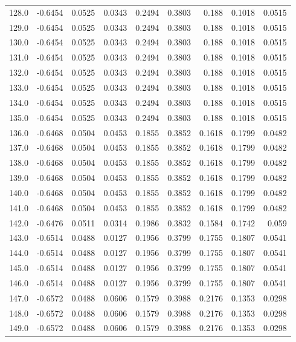 \begin{longtable}{lrrrrrrrr}
128.0 & -0.6454 & 0.0525 & 0.0343 & 0.2494 & 0.3803 & 0.188 & 0.1018 & 0.0515 \\
129.0 & -0.6454 & 0.0525 & 0.0343 & 0.2494 & 0.3803 & 0.188 & 0.1018 & 0.0515 \\
130.0 & -0.6454 & 0.0525 & 0.0343 & 0.2494 & 0.3803 & 0.188 & 0.1018 & 0.0515 \\
131.0 & -0.6454 & 0.0525 & 0.0343 & 0.2494 & 0.3803 & 0.188 & 0.1018 & 0.0515 \\
132.0 & -0.6454 & 0.0525 & 0.0343 & 0.2494 & 0.3803 & 0.188 & 0.1018 & 0.0515 \\
133.0 & -0.6454 & 0.0525 & 0.0343 & 0.2494 & 0.3803 & 0.188 & 0.1018 & 0.0515 \\
134.0 & -0.6454 & 0.0525 & 0.0343 & 0.2494 & 0.3803 & 0.188 & 0.1018 & 0.0515 \\
135.0 & -0.6454 & 0.0525 & 0.0343 & 0.2494 & 0.3803 & 0.188 & 0.1018 & 0.0515 \\
136.0 & -0.6468 & 0.0504 & 0.0453 & 0.1855 & 0.3852 & 0.1618 & 0.1799 & 0.0482 \\
137.0 & -0.6468 & 0.0504 & 0.0453 & 0.1855 & 0.3852 & 0.1618 & 0.1799 & 0.0482 \\
138.0 & -0.6468 & 0.0504 & 0.0453 & 0.1855 & 0.3852 & 0.1618 & 0.1799 & 0.0482 \\
139.0 & -0.6468 & 0.0504 & 0.0453 & 0.1855 & 0.3852 & 0.1618 & 0.1799 & 0.0482 \\
140.0 & -0.6468 & 0.0504 & 0.0453 & 0.1855 & 0.3852 & 0.1618 & 0.1799 & 0.0482 \\
141.0 & -0.6468 & 0.0504 & 0.0453 & 0.1855 & 0.3852 & 0.1618 & 0.1799 & 0.0482 \\
142.0 & -0.6476 & 0.0511 & 0.0314 & 0.1986 & 0.3832 & 0.1584 & 0.1742 & 0.059 \\
143.0 & -0.6514 & 0.0488 & 0.0127 & 0.1956 & 0.3799 & 0.1755 & 0.1807 & 0.0541 \\
144.0 & -0.6514 & 0.0488 & 0.0127 & 0.1956 & 0.3799 & 0.1755 & 0.1807 & 0.0541 \\
145.0 & -0.6514 & 0.0488 & 0.0127 & 0.1956 & 0.3799 & 0.1755 & 0.1807 & 0.0541 \\
146.0 & -0.6514 & 0.0488 & 0.0127 & 0.1956 & 0.3799 & 0.1755 & 0.1807 & 0.0541 \\
147.0 & -0.6572 & 0.0488 & 0.0606 & 0.1579 & 0.3988 & 0.2176 & 0.1353 & 0.0298 \\
148.0 & -0.6572 & 0.0488 & 0.0606 & 0.1579 & 0.3988 & 0.2176 & 0.1353 & 0.0298 \\
149.0 & -0.6572 & 0.0488 & 0.0606 & 0.1579 & 0.3988 & 0.2176 & 0.1353 & 0.0298 \\

\end{longtable}
